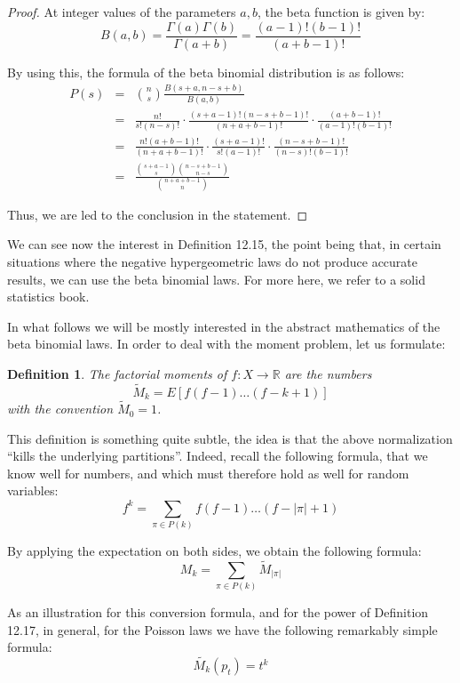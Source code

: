 \documentclass[12pt]{amsbook}
\newtheorem{definition}[theorem]{Definition}
\begin{document}
\begin{proof}
At integer values of the parameters $a,b$, the beta function is given by:
$$B(a,b)=\frac{\Gamma(a)\Gamma(b)}{\Gamma(a+b)}=\frac{(a-1)!(b-1)!}{(a+b-1)!}$$

By using this, the formula of the beta binomial distribution is as follows:
\begin{eqnarray*}
P(s)
&=&\binom{n}{s}\frac{B(s+a,n-s+b)}{B(a,b)}\\
&=&\frac{n!}{s!(n-s)!}\cdot\frac{(s+a-1)!(n-s+b-1)!}{(n+a+b-1)!}\cdot\frac{(a+b-1)!}{(a-1)!(b-1)!}\\
&=&\frac{n!(a+b-1)!}{(n+a+b-1)!}\cdot\frac{(s+a-1)!}{s!(a-1)!}\cdot\frac{(n-s+b-1)!}{(n-s)!(b-1)!}\\
&=&\frac{\binom{s+a-1}{s}\binom{n-s+b-1}{n-s}}{\binom{n+a+b-1}{n}}
\end{eqnarray*}

Thus, we are led to the conclusion in the statement.
\end{proof}

We can see now the interest in Definition 12.15, the point being that, in certain situations where the negative hypergeometric laws do not produce accurate results, we can use the beta binomial laws. For more here, we refer to a solid statistics book. 

\bigskip

In what follows we will be mostly interested in the abstract mathematics of the beta binomial laws. In order to deal with the moment problem, let us formulate:

\begin{definition}
The factorial moments of $f:X\to\mathbb R$ are the numbers
$$\widetilde{M}_k=E[f(f-1)\ldots(f-k+1)]$$
with the convention $\widetilde{M}_0=1$.
\end{definition}

This definition is something quite subtle, the idea is that the above normalization ``kills the underlying partitions''. Indeed, recall the following formula, that we know well for numbers, and which must therefore hold as well for random variables:
$$f^k=\sum_{\pi\in P(k)}f(f-1)\ldots(f-|\pi|+1)$$

By applying the expectation on both sides, we obtain the following formula:
$$M_k=\sum_{\pi\in P(k)}\widetilde{M}_{|\pi|}$$

As an illustration for this conversion formula, and for the power of Definition 12.17, in general, for the Poisson laws we have the following remarkably simple formula:
$$\widetilde{M_k}(p_t)=t^k$$
\end{document}
